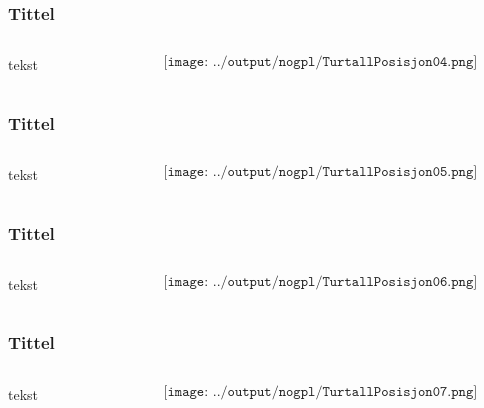 \documentclass[aspectratio=169,xcolor=dvipsnames]{beamer}
\begin{document}
\begin{frame}
	\frametitle{Tittel}
	\begin{columns}
		\begin{column}{0.5\textwidth}
tekst
			
		\end{column}

		\begin{column}{0.5\textwidth}
	$$\texttt{[image: ../output/nogpl/TurtallPosisjon04.png]}$$
		\end{column}
	\end{columns}
\end{frame}

\begin{frame}
	\frametitle{Tittel}
	\begin{columns}
		\begin{column}{0.5\textwidth}
tekst
			
		\end{column}

		\begin{column}{0.5\textwidth}
	$$\texttt{[image: ../output/nogpl/TurtallPosisjon05.png]}$$
		\end{column}
	\end{columns}
\end{frame}

\begin{frame}
	\frametitle{Tittel}
	\begin{columns}
		\begin{column}{0.5\textwidth}
tekst
			
		\end{column}

		\begin{column}{0.5\textwidth}
	$$\texttt{[image: ../output/nogpl/TurtallPosisjon06.png]}$$
		\end{column}
	\end{columns}
\end{frame}

\begin{frame}
	\frametitle{Tittel}
	\begin{columns}
		\begin{column}{0.5\textwidth}
tekst
			
		\end{column}

		\begin{column}{0.5\textwidth}
	$$\texttt{[image: ../output/nogpl/TurtallPosisjon07.png]}$$
		\end{column}
	\end{columns}
\end{frame}
\end{document}
